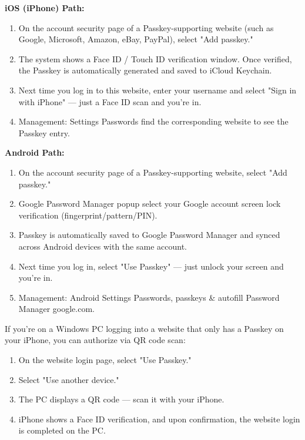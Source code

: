 
\textbf{iOS (iPhone) Path:}

\begin{enumerate}
  \item On the account security page of a Passkey-supporting website (such as Google, Microsoft, Amazon, eBay, PayPal), select "Add passkey."
  \item The system shows a Face ID / Touch ID verification window. Once verified, the Passkey is automatically generated and saved to iCloud Keychain.
  \item Next time you log in to this website, enter your username and select "Sign in with iPhone" — just a Face ID scan and you're in.
  \item Management: Settings Passwords find the corresponding website to see the Passkey entry.
\end{enumerate}

\textbf{Android Path:}

\begin{enumerate}
  \item On the account security page of a Passkey-supporting website, select "Add passkey."
  \item Google Password Manager popup select your Google account screen lock verification (fingerprint/pattern/PIN).
  \item Passkey is automatically saved to Google Password Manager and synced across Android devices with the same account.
  \item Next time you log in, select "Use Passkey" — just unlock your screen and you're in.
  \item Management: Android Settings Passwords, passkeys \& autofill Password Manager google.com.
\end{enumerate}


If you're on a Windows PC logging into a website that only has a Passkey on your iPhone, you can authorize via QR code scan:

\begin{enumerate}
  \item On the website login page, select "Use Passkey."
  \item Select "Use another device."
  \item The PC displays a QR code — scan it with your iPhone.
  \item iPhone shows a Face ID verification, and upon confirmation, the website login is completed on the PC.
\end{enumerate}

